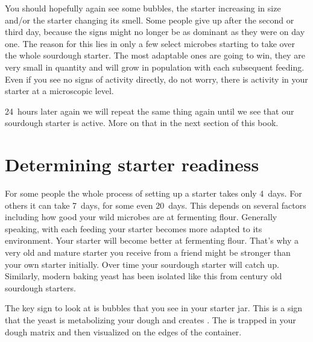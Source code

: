 You should hopefully again see some bubbles, the starter increasing
in size and/or the starter changing its smell. Some people give
up after the second or third day, because the signs might no longer
be as dominant as they were on day one. The reason for this lies in only a few
select microbes starting to take over the whole sourdough starter. The most
adaptable ones are going to win, they are very small in quantity and will
grow in population with each subsequent feeding. Even if you see no signs
of activity directly, do not worry, there is activity in
your starter at a microscopic level.

24~hours later again we will repeat the same thing again until
we see that our sourdough starter is active. More on that in the
next section of this book.

\section{Determining starter readiness}

For some people the whole process of setting up a starter takes
only 4~days. For others it can take 7~days, for some even 20~days.
This depends on several factors including how good your wild microbes
are at fermenting flour. Generally speaking, with each feeding
your starter becomes more adapted to its environment. Your
starter will become better at fermenting flour. That's why
a very old and mature starter you receive from a friend might
be stronger than your own starter initially. Over time
your sourdough starter will catch up. Similarly, modern baking
yeast has been isolated like this from century old sourdough
starters.

\begin{flowchart}[!htb]
\centering
  
  \caption[Determining sourdough starter readiness]{A flow chart showing you how to
      determine if your sourdough starter is ready to be used. Make sure to
      wait at least \qtyrange{6}{12}{\hour} after feeding your
      starter to check its readiness. To evaluate it, look at your starter's size
      increase, airy texture and take note of its smell.
      All three factors are important to properly evaluate your starter's activity level.
      An active starter is an important foundation for a successful dough fermentation}%
  \label{fig:sourdough-starter-readiness}
\end{flowchart}

The key sign to look at is bubbles that you see in your starter
jar. This is a sign that the yeast is metabolizing your
dough and creates . The  is trapped in your dough
matrix and then visualized on the edges of the container.


